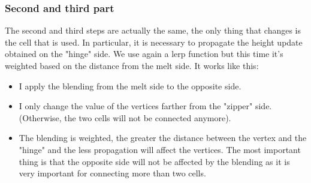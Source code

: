 \begin{figure}[hbt!]
	\centering
	\qquad
	\caption{}
\end{figure}

\subsubsection{Second and third part}

The second and third steps are actually the same, the only thing that changes is the cell that is used. In particular, it is necessary to propagate the height update obtained on the "hinge" side. We use again a lerp function but this time it's weighted based on the distance from the melt side. It works like this:

	\begin{itemize}
		
		\item I apply the blending from the melt side to the opposite side.
		\item I only change the value of the vertices farther from the "zipper" side. (Otherwise, the two cells will not be connected anymore).
		\item The blending is weighted, the greater the distance between the vertex and the "hinge" and the less propagation will affect the vertices. The most important thing is that the opposite side will not be affected by the blending as it is very important for connecting more than two cells.
			
	\end{itemize}

